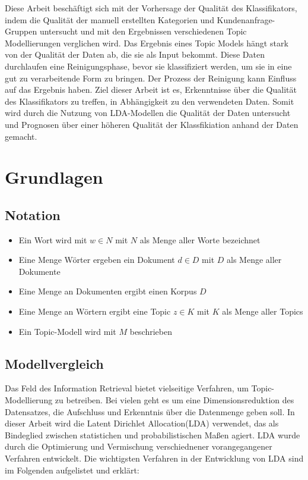 \documentclass[german,version-2020-11]{uzl-thesis}
\begin{document}
Diese Arbeit beschäftigt sich mit der Vorhersage der Qualität des Klassifikators, indem die Qualität der manuell erstellten Kategorien und Kundenanfrage-Gruppen untersucht und mit den Ergebnissen verschiedenen Topic Modellierungen verglichen wird. Das Ergebnis eines Topic Models hängt stark von der Qualität der Daten ab, die sie als Input bekommt. Diese Daten durchlaufen eine Reinigungsphase, bevor sie klassifiziert werden, um sie in eine gut zu verarbeitende Form zu bringen. Der Prozess der Reinigung kann Einfluss auf das Ergebnis haben. Ziel dieser Arbeit ist es, Erkenntnisse über die Qualität des Klassifikators zu treffen, in Abhängigkeit zu den verwendeten Daten. Somit wird durch die Nutzung von LDA-Modellen die Qualität der Daten untersucht und Prognosen über einer höheren Qualität der Klassfikiation anhand der Daten gemacht. 

\chapter{Grundlagen}%


\section{Notation}

\begin{itemize}
	\item Ein Wort wird mit $w \in N$ mit $N$ als Menge aller Worte bezeichnet
	\item Eine Menge Wörter ergeben ein Dokument $d \in D$ mit $D$ als Menge aller Dokumente
	\item Eine Menge an Dokumenten ergibt einen Korpus $D$
	\item Eine Menge an Wörtern ergibt eine Topic $z \in K$ mit $K$ als Menge aller Topics
	\item Ein Topic-Modell wird mit $M$ beschrieben
\end{itemize}


\section{Modellvergleich}

Das Feld des Information Retrieval bietet vielseitige Verfahren, um Topic-Modellierung zu betreiben. Bei vielen geht es um eine Dimensionsreduktion des Datensatzes, die Aufschluss und Erkenntnis über die Datenmenge geben soll. In dieser Arbeit wird die Latent Dirichlet Allocation(LDA) verwendet, das als Bindeglied zwischen statistichen und probabilistischen Maßen agiert. LDA wurde durch die Optimierung und Vermischung verschiednener vorangegangener Verfahren entwickelt. Die wichtigsten Verfahren in der Entwicklung von LDA sind im Folgenden aufgelistet und erklärt: 
\end{document}
